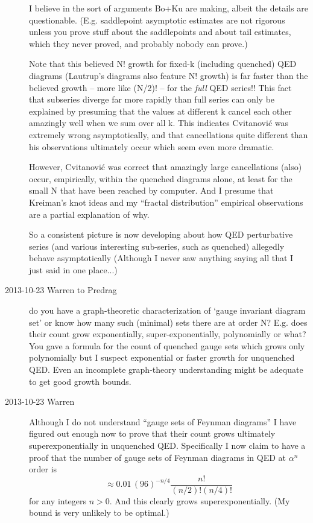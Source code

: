 \begin{description}
I believe in the sort of arguments Bo+Ku are making, albeit the
details are questionable.
(E.g. saddlepoint asymptotic estimates are not rigorous unless you prove stuff
about the saddlepoints and about tail estimates, which they never proved, and
probably nobody can prove.)

Note that this believed N! growth for fixed-k (including quenched) QED diagrams
(Lautrup's diagrams also feature N! growth) is far faster than the
believed growth -- more like (N/2)! -- for the \emph{full} QED series!!
This fact that subseries diverge far more rapidly than full series
can only be explained by presuming that
the values at different k cancel each other amazingly well when we sum
over all k.
This indicates Cvitanovi\'c was extremely wrong asymptotically, and that
cancellations
quite different than his observations ultimately occur which seem even
more dramatic.

However, Cvitanovi\'c was correct that amazingly large cancellations
(also) occur, empirically, within the quenched diagrams alone, at least
for the small N that have been reached by computer.   And I presume that
Kreiman's knot ideas and my ``fractal distribution''
empirical observations are a partial explanation of why.

So a consistent picture is now developing about how QED perturbative series (and
various interesting sub-series, such as quenched) allegedly behave
asymptotically
(Although I never saw anything saying all that I just said in one place...)

\item[2013-10-23  Warren to Predrag]  do you have a graph-theoretic
characterization of `gauge invariant diagram set' or know how many such
(minimal) sets there are at order N?   E.g. does their count grow
exponentially, super-exponentially, polynomially or what?  You gave a
formula for the count of quenched gauge sets which grows only polynomially
but I suspect exponential or faster growth for unquenched QED.  Even an
incomplete graph-theory understanding might be adequate to get good growth
bounds.

\item[2013-10-23 Warren]
Although I do not understand ``gauge sets of Feynman diagrams''
I have figured out enough now to prove that their count grows ultimately
superexponentially in unquenched QED.  Specifically I now claim to have a
proof that the number of gauge sets of Feynman diagrams in QED
at $\alpha^n$ order is
\[
  \approx 0.01\,(96)^{-n/4}\frac{n!}{(n/2)!  (n/4)!}
\]
for any integers $n>0$.
And this clearly grows superexponentially.
(My bound is very unlikely to be optimal.)


\end{description}
